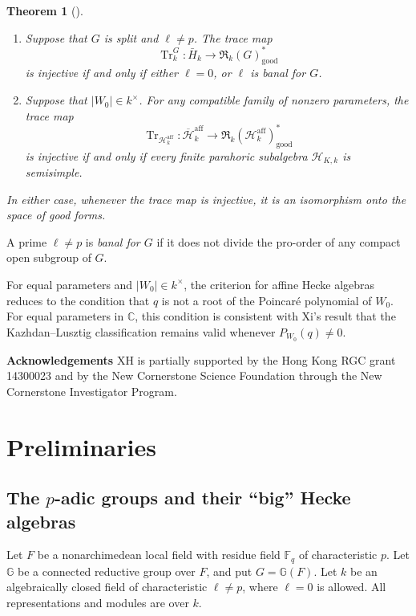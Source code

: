 \documentclass[11pt,letterpaper]{amsart}
\newtheorem{theoremintro}{Theorem}
\theoremstyle{definition}
\numberwithin{equation}{section}
\numberwithin{theorem}{section}
\newcommand{\kk}{k}
\newcommand{\CC}{\mathbb C}
\newcommand{\G}{\mathbb G}
\newcommand{\cH}{\mathcal H}
\newcommand{\bH}{\overline{\mathcal H}}
\newcommand{\cR}{\mathfrak R}
\DeclareMathOperator{\Tr}{Tr}
\begin{document}
\begin{theoremintro}[{}]
\label{thm:intro-injectivity}
\leavevmode
\begin{enumerate}
\item
Suppose that $G$ is split and $\ell\ne p$.
The trace map
\[
 \Tr_\kk^G:\bar H_\kk
   \longrightarrow
   \cR_\kk(G)^*_{\mathrm{good}}
\]
is injective if and only if either $\ell=0$, or $\ell$ is banal for $G$.

\item
Suppose that $|W_0|\in\kk^\times$.
For any compatible family of nonzero parameters,
the trace map
\[
 \Tr_{\cH_\kk^{\mathrm{aff}}}:
   \bH_\kk^{\mathrm{aff}}
   \longrightarrow
   \cR_\kk(\cH_\kk^{\mathrm{aff}})^*_{\mathrm{good}}
\]
is injective if and only if every finite parahoric
subalgebra $\cH_{K,\kk}$ is semisimple.
\end{enumerate}
In either case, whenever the trace map is injective,
it is an isomorphism onto the space of good forms.
\end{theoremintro}

A prime $\ell\ne p$ is \emph{banal for $G$} if it does not divide the pro-order of any compact open subgroup of $G$.

For equal parameters and $|W_0|\in\kk^\times$, the criterion for affine Hecke algebras reduces to the condition that $q$ is not a root of the Poincar\'e polynomial of $W_0$.
For equal parameters in $\CC$, this condition is consistent with Xi's result \cite[Theorem~3.3]{Xi} that the Kazhdan--Lusztig classification remains valid whenever
$P_{W_0}(q)\ne0$.

\smallskip

{\bf Acknowledgements} XH is partially supported by the Hong Kong RGC grant 14300023 and by the New Cornerstone Science Foundation through the New Cornerstone Investigator Program. 

\section{Preliminaries}


\label{sec:preliminaries}
\subsection{The \texorpdfstring{$p$}{p}-adic groups and their ``big'' Hecke algebras}
\label{subsec:hecke-algebras}
Let $F$ be a nonarchimedean local field with residue field
$\mathbb F_q$ of characteristic $p$. Let $\G$ be a connected
reductive group over $F$, and put $G=\G(F)$. Let $\kk$ be an
algebraically closed field of characteristic $\ell\ne p$,
where $\ell=0$ is allowed. All representations and modules are over $\kk$.
\end{document}
